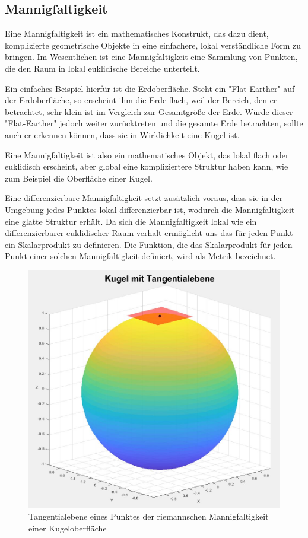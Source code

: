 \subsection{Mannigfaltigkeit}

Eine Mannigfaltigkeit ist ein mathematisches Konstrukt, das dazu dient, komplizierte geometrische Objekte in eine einfachere, lokal verständliche Form zu bringen.
Im Wesentlichen ist eine Mannigfaltigkeit eine Sammlung von Punkten, die den Raum in lokal euklidische Bereiche unterteilt. 

Ein einfaches Beispiel hierfür ist die Erdoberfläche.
Steht ein "Flat-Earther" auf der Erdoberfläche, so erscheint ihm die Erde flach, weil der Bereich, den er betrachtet, sehr klein ist im Vergleich zur Gesamtgröße der Erde.
Würde dieser "Flat-Earther" jedoch weiter zurücktreten und die gesamte Erde betrachten, sollte auch er erkennen können, dass sie in Wirklichkeit eine Kugel ist.

Eine Mannigfaltigkeit ist also ein mathematisches Objekt, das lokal flach oder euklidisch erscheint, aber global eine kompliziertere Struktur haben kann, wie zum Beispiel die Oberfläche einer Kugel.

Eine differenzierbare Mannigfaltigkeit setzt zusätzlich voraus, dass sie in der Umgebung jedes Punktes lokal differenzierbar ist, wodurch die Mannigfaltigkeit eine glatte Struktur erhält.
Da sich die Mannigfaltigkeit lokal wie ein differenzierbarer euklidischer Raum verhalt  ermöglicht uns das für jeden Punkt ein Skalarprodukt zu definieren.
Die Funktion, die das Skalarprodukt für jeden Punkt einer solchen Mannigfaltigkeit definiert, wird als Metrik bezeichnet.

\begin{figure}
	\centering
	\includegraphics[width=1\linewidth]{papers/geodaeten/Abbildungen/MetrischerTensor/Tangentialebene}
	\caption{Tangentialebene eines Punktes der riemannschen Mannigfaltigkeit einer Kugeloberfläche}
	\label{geodaeten:figure:MetrischerTensor:Tangentialebene}
\end{figure}

